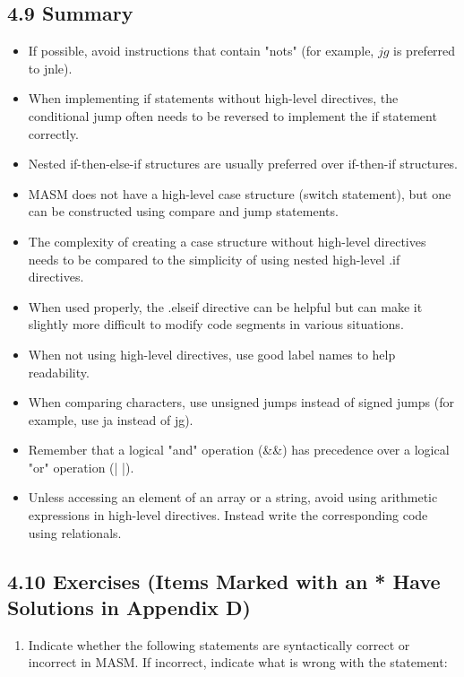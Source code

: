 \documentclass[10pt]{book}
\begin{document}
\subsection*{4.9 Summary}
\begin{itemize}
  \item If possible, avoid instructions that contain "nots" (for example, $j g$ is preferred to jnle).
  \item When implementing if statements without high-level directives, the conditional jump often needs to be reversed to implement the if statement correctly.
  \item Nested if-then-else-if structures are usually preferred over if-then-if structures.
  \item MASM does not have a high-level case structure (switch statement), but one can be constructed using compare and jump statements.
  \item The complexity of creating a case structure without high-level directives needs to be compared to the simplicity of using nested high-level .if directives.
  \item When used properly, the .elseif directive can be helpful but can make it slightly more difficult to modify code segments in various situations.
  \item When not using high-level directives, use good label names to help readability.
  \item When comparing characters, use unsigned jumps instead of signed jumps (for example, use ja instead of jg).
  \item Remember that a logical "and" operation (\&\&) has precedence over a logical "or" operation (| |).
  \item Unless accessing an element of an array or a string, avoid using arithmetic expressions in high-level directives. Instead write the corresponding code using relationals.
\end{itemize}


\subsection*{4.10 Exercises (Items Marked with an * Have Solutions in Appendix D)}
\begin{enumerate}
  \item Indicate whether the following statements are syntactically correct or incorrect in MASM. If incorrect, indicate what is wrong with the statement:
\end{enumerate}
\end{document}
